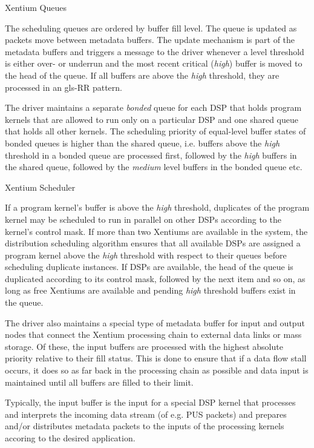 %
{Xentium Queues}{%
The scheduling queues are ordered by buffer fill level. The queue is updated
as packets move between metadata buffers. The update mechanism is part of the
metadata buffers and triggers a message to the driver whenever a level threshold
is either over- or underrun and the most recent critical (\emph{high}) buffer is
moved to the head of the queue. If all buffers are above the \emph{high}
threshold, they are processed in an \gls{gls-RR} pattern. \newline

The driver maintains a separate \emph{bonded} queue for each \gls{DSP} that
holds program kernels that are allowed to run only on a particular \gls{DSP} and
one shared queue that holds all other kernels. The scheduling priority of
equal-level buffer states of bonded queues is higher than the shared queue,
i.e. buffers above the \emph{high} threshold in a bonded queue are processed
first, followed by the \emph{high} buffers in the shared queue, followed by the
\emph{medium} level buffers in the bonded queue etc.
}%
{}{}


%
{Xentium Scheduler}{%
If a program kernel's buffer is above the \emph{high} threshold, duplicates of
the program kernel may be scheduled to run in parallel on other \glspl{DSP}
according to the kernel's control mask. If more than two \glspl{Xentium} are
available in the system, the distribution scheduling algorithm ensures that 
all available \glspl{DSP} are assigned a program kernel above the \emph{high}
threshold with respect to their queues before scheduling duplicate instances.
If \glspl{DSP} are available, the head of the queue is duplicated according to
its control mask, followed by the next item and so on, as long as free
\glspl{Xentium} are available and pending \emph{high} threshold buffers exist
in the queue. \newline

The driver also maintains a special type of metadata buffer for input and output
nodes that connect the \gls{Xentium} processing chain to external data links
or mass storage. Of these, the input buffers are processed with the highest
absolute priority relative to their fill status. This is done to ensure that
if a data flow stall occurs, it does so as far back in the processing chain as
possible and data input is maintained until all buffers are filled to their
limit.
}%
{}{%
Typically, the input buffer is the input for a special \gls{DSP} kernel
that processes and interprets the incoming data stream (of e.g. \gls{PUS} 
packets) and prepares and/or distributes metadata packets to the inputs of the
processing kernels accoring to the desired application.
}



